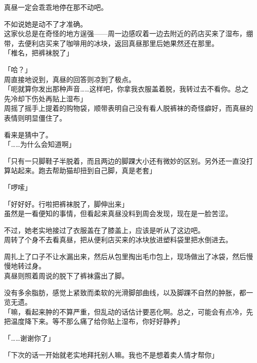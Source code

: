 真昼一定会乖乖地停在那不动吧。

不如说她是动不了才准确。\\

这家伙总是在奇怪的地方逞强——周一边感叹着一边去附近的药店买来了湿布，绷带，去便利店买来了咖啡用的冰块，返回真昼那里后她果然还在那里。\\

「椎名，把裤袜脱了」

「哈？」\\

周直接地说到，真昼的回答则凉到了极点。\\

「呃就算你发出那种声音……这样吧，你拿我衣服盖着脱，我转过去不看你。总之先冷却下伤处再贴上湿布」\\

周摇了摇手上提着的购物袋，顺带表明自己没有看人脱裤袜的奇怪癖好，而真昼的表情则明显僵住了。

看来是猜中了。\\

「……为什么会知道啊」

「只有一只脚鞋子半脱着，而且两边的脚踝大小还有微妙的区别。另外还一直没打算站起来。跑去帮助猫却扭到自己脚，真是老套」

「啰嗦」

「好好好。行啦把裤袜脱了，脚伸出来」\\

虽然是一看便知的事情，但看起来真昼没料到周会发现，现在是一脸苦涩。

不过，她老实地接过了衣服盖在了膝盖上，应该是听从了这边吧。\\

周转了个身不去看真昼，把从便利店买来的冰块放进塑料袋里把水倒进去。

周扎上了口子不让水漏出来，然后从包里掏出毛巾包上，现场做出了冰袋，然后慢慢地转过身。\\

真昼则照着周说的脱下了裤袜露出了脚。

没有多余脂肪，感觉上紧致而柔软的光滑脚部曲线，以及脚踝不自然的肿胀，都一览无遗。\\

「嘛，看起来肿的不算严重，但乱动的话估计要恶化啊。总之，可能会有点冷，先把温度降下来。等不那么痛了给你贴上湿布，你好好静养」

「……谢谢你了」

「下次的话一开始就老实地拜托别人嘛。我也不是想着卖人情才帮你」\\

